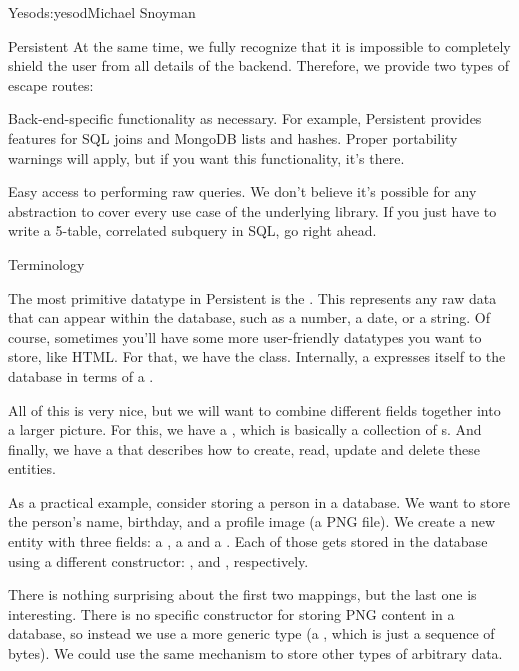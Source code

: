 \begin{aosachapter}{Yesod}{s:yesod}{Michael Snoyman}
\begin{aosasect1}{Persistent}
At the same time, we fully recognize that it is impossible to
completely shield the user from all details of the
backend. Therefore, we provide two types of escape routes:

\begin{aosaitemize}

\item Back-end-specific functionality as necessary. For
  example, Persistent provides features for SQL joins and MongoDB
  lists and hashes. Proper portability warnings will apply, but if you
  want this functionality, it's there.

\item Easy access to performing raw queries. We don't believe it's
  possible for any abstraction to cover every use case of the
  underlying library. If you just have to write a 5-table, correlated
  subquery in SQL, go right ahead.

\end{aosaitemize}

\begin{aosasect2}{Terminology}

The most primitive datatype in Persistent is the
. This represents any raw data that can appear
within the database, such as a number, a date, or a string. Of course,
sometimes you'll have some more user-friendly datatypes you want to
store, like HTML. For that, we have the 
class. Internally, a  expresses itself to the
database in terms of a .

All of this is very nice, but we will want to combine different fields
together into a larger picture. For this, we have a
, which is basically a collection of
s. And finally, we have a 
that describes how to create, read, update and delete these entities.

As a practical example, consider storing a person in a database. We
want to store the person's name, birthday, and a profile image (a PNG
file). We create a new entity  with three fields: a
, a  and a . Each of those gets stored
in the database using a different  constructor:
,  and ,
respectively.

There is nothing surprising about the first two mappings, but the last
one is interesting. There is no specific constructor for storing PNG
content in a database, so instead we use a more generic type (a
, which is just a sequence of bytes). We could use the same
mechanism to store other types of arbitrary data.


\end{aosasect2}
\end{aosasect1}
\end{aosachapter}
